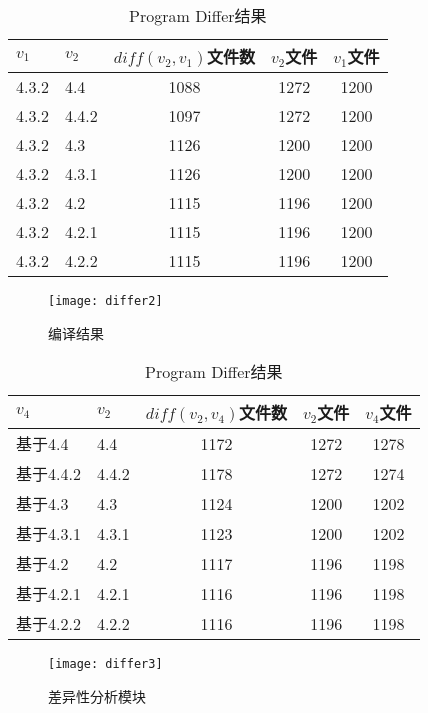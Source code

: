 \begin{table}[H]
	\caption{Program Differ结果}
	\label{data_differ_2}
	\centering
	\begin{tabular}{llccc}
		\toprule[1.5pt]
		{\heiti $v_1$} & {\heiti $v_2$} & {\heiti $diff(v_2,v_1)$文件数} & {\heiti $v_2$文件} & {\heiti $v_1$文件} \\\midrule[1pt]
		4.3.2 & 4.4	& 1088 & 1272 & 1200\\		
		4.3.2 & 4.4.2 & 1097 & 1272	& 1200	\\
		4.3.2 & 4.3 	 & 1126 & 1200	& 1200		\\
		4.3.2 & 4.3.1  & 1126 & 1200 & 1200			\\
		4.3.2 & 4.2 	& 1115 & 1196 & 1200		\\
		4.3.2 & 4.2.1 & 1115 & 1196 & 1200		\\
		4.3.2 & 4.2.2  & 1115 & 1196 & 1200		\\
		\bottomrule[1.5pt]
	\end{tabular}
\end{table}

\begin{figure}[H]
	\centering
	\texttt{[image: differ2]}
	\caption {编译结果}
	\label {差异性分析模块}	
\end{figure}

\begin{table}[H]
	\caption{Program Differ结果}
	\label{data_differ_3}
	\centering
	\begin{tabular}{llccc}
		\toprule[1.5pt]
		{\heiti $v_4$} & {\heiti $v_2$} & {\heiti $diff(v_2,v_4)$文件数} & {\heiti $v_2$文件} & {\heiti $v_4$文件} \\\midrule[1pt]
		基于4.4 & 4.4	& 1172 & 1272 &	1278\\		
		基于4.4.2 & 4.4.2 & 1178 & 1272 & 1274		\\
		基于4.3 & 4.3 	 & 1124 & 1200	& 1202		\\
		基于4.3.1 & 4.3.1  & 1123 & 1200	& 1202		\\
		基于4.2 & 4.2 	& 1117 & 1196 & 1198		\\
		基于4.2.1 & 4.2.1 & 1116 & 1196	& 1198		\\
		基于4.2.2 & 4.2.2  & 1116 & 1196 & 1198		\\
		\bottomrule[1.5pt]
	\end{tabular}
\end{table}

\begin{figure}[H]
	\centering
	\texttt{[image: differ3]}
	\caption {差异性分析模块}
	\label {differ3}	
\end{figure}

